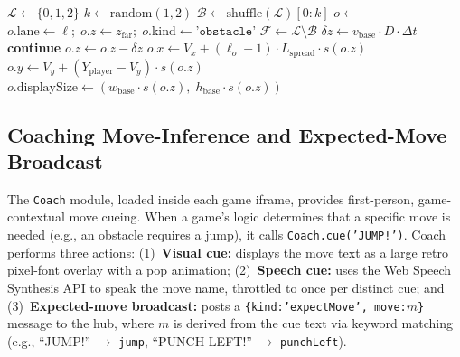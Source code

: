 \documentclass[runningheads]{llncs}
\begin{document}
\begin{algorithm}[htbp]
\caption{Pooled Pseudo-3D Object Spawner}
\label{alg:pool}
\begin{algorithmic}[1]
  \State $\mathcal{L} \gets \{0, 1, 2\}$ 
  \State $k \gets \text{random}(1, 2)$ 
  \State $\mathcal{B} \gets \text{shuffle}(\mathcal{L})[0{:}k]$
    \State $o \gets$  
    \State $o.\text{lane} \gets \ell;\; o.z \gets z_{\text{far}};\; o.\text{kind} \gets \texttt{'obstacle'}$
  \EndFor
  \State $\mathcal{F} \gets \mathcal{L} \setminus \mathcal{B}$
    \State {}
  \EndIf
\EndProcedure
\Statex
{}
  \State $\delta z \gets v_{\text{base}} \cdot D \cdot \Delta t$ 
     \textbf{continue} \EndIf
    \State $o.z \gets o.z - \delta z$
    \State $o.x \gets V_x + (\ell_o - 1) \cdot L_{\text{spread}} \cdot s(o.z)$
    \State $o.y \gets V_y + (Y_{\text{player}} - V_y) \cdot s(o.z)$
    \State $o.\text{displaySize} \gets (w_{\text{base}} \cdot s(o.z),\; h_{\text{base}} \cdot s(o.z))$
      \State {}
    \EndIf
      \EndIf
  \EndFor
\EndProcedure
\end{algorithmic}
\end{algorithm}

\subsection{Coaching Move-Inference and Expected-Move Broadcast}
\label{sec:coaching}

The \texttt{Coach} module, loaded inside each game iframe, provides
first-person, game-contextual move cueing. When a game's logic determines
that a specific move is needed (e.g., an obstacle requires a jump), it
calls \texttt{Coach.cue('JUMP!')}. Coach performs three actions:
(1)~\textbf{Visual cue:} displays the move text as a large retro
pixel-font overlay with a pop animation;
(2)~\textbf{Speech cue:} uses the Web Speech Synthesis API to speak
the move name, throttled to once per distinct cue; and
(3)~\textbf{Expected-move broadcast:} posts a
\texttt{\{kind:'expectMove', move:$m$\}} message to the hub, where
$m$ is derived from the cue text via keyword matching (e.g.,
``JUMP!'' $\to$ \texttt{jump}, ``PUNCH LEFT!'' $\to$ \texttt{punchLeft}).
\end{document}
